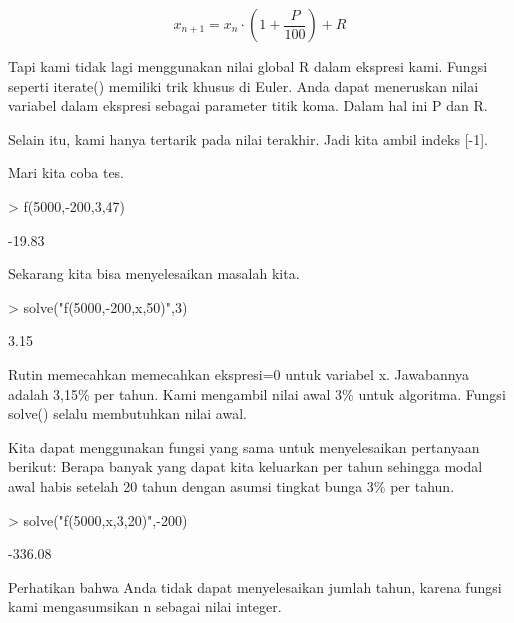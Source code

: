 \documentclass[a4paper,10pt]{article}
\begin{document}
\begin{eulernotebook}
\begin{eulercomment}
\begin{eulercomment}
\begin{eulercomment}
\begin{eulercomment}
\begin{eulercomment}
\begin{eulercomment}
\begin{eulercomment}
\begin{eulercomment}
\begin{eulercomment}
\begin{eulercomment}
\begin{eulercomment}
\begin{eulercomment}
\begin{eulercomment}
\end{eulercomment}
\begin{eulerformula}
\[
x_{n+1} = x_n \cdot \left (1 + \frac {P}{100} \right) + R
\]
\end{eulerformula}
\begin{eulercomment}
Tapi kami tidak lagi menggunakan nilai global R dalam ekspresi kami.
Fungsi seperti iterate() memiliki trik khusus di Euler. Anda dapat
meneruskan nilai variabel dalam ekspresi sebagai parameter titik koma.
Dalam hal ini P dan R.

Selain itu, kami hanya tertarik pada nilai terakhir. Jadi kita ambil
indeks [-1].

Mari kita coba tes.
\end{eulercomment}
\begin{eulerprompt}
> f(5000,-200,3,47)
\end{eulerprompt}
\begin{euleroutput}
       -19.83 
\end{euleroutput}
\begin{eulercomment}
Sekarang kita bisa menyelesaikan masalah kita.
\end{eulercomment}
\begin{eulerprompt}
> solve("f(5000,-200,x,50)",3)
\end{eulerprompt}
\begin{euleroutput}
         3.15 
\end{euleroutput}
\begin{eulercomment}
Rutin memecahkan memecahkan ekspresi=0 untuk variabel x. Jawabannya
adalah 3,15\% per tahun. Kami mengambil nilai awal 3\% untuk algoritma.
Fungsi solve() selalu membutuhkan nilai awal.

Kita dapat menggunakan fungsi yang sama untuk menyelesaikan pertanyaan
berikut: Berapa banyak yang dapat kita keluarkan per tahun sehingga
modal awal habis setelah 20 tahun dengan asumsi tingkat bunga 3\% per
tahun.
\end{eulercomment}
\begin{eulerprompt}
> solve("f(5000,x,3,20)",-200)
\end{eulerprompt}
\begin{euleroutput}
      -336.08 
\end{euleroutput}
\begin{eulercomment}
Perhatikan bahwa Anda tidak dapat menyelesaikan jumlah tahun, karena
fungsi kami mengasumsikan n sebagai nilai integer.


\end{eulercomment}
\end{eulercomment}
\end{eulercomment}
\end{eulercomment}
\end{eulercomment}
\end{eulercomment}
\end{eulercomment}
\end{eulercomment}
\end{eulercomment}
\end{eulercomment}
\end{eulercomment}
\end{eulercomment}
\end{eulercomment}
\end{eulernotebook}
\end{document}
